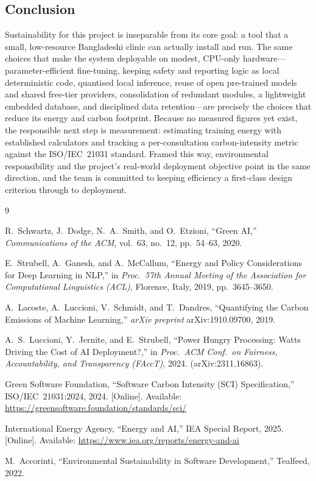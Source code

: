 \documentclass[11pt,a4paper]{article}
\begin{document}
\subsection{Conclusion}
Sustainability for this project is inseparable from its core goal: a tool that a small,
low-resource Bangladeshi clinic can actually install and run. The same choices that make
the system deployable on modest, CPU-only hardware---parameter-efficient fine-tuning,
keeping safety and reporting logic as local deterministic code, quantised local
inference, reuse of open pre-trained models and shared free-tier providers, consolidation
of redundant modules, a lightweight embedded database, and disciplined data
retention---are precisely the choices that reduce its energy and carbon footprint.
Because no measured figures yet exist, the responsible next step is measurement:
estimating training energy with established calculators and tracking a per-consultation
carbon-intensity metric against the ISO/IEC~21031 standard. Framed this way, environmental
responsibility and the project's real-world deployment objective point in the same
direction, and the team is committed to keeping efficiency a first-class design criterion
through to deployment.

\begin{thebibliography}{9}
\footnotesize

R.~Schwartz, J.~Dodge, N.~A.~Smith, and O.~Etzioni,
``Green AI,'' \emph{Communications of the ACM}, vol.~63, no.~12, pp.~54--63, 2020.

E.~Strubell, A.~Ganesh, and A.~McCallum,
``Energy and Policy Considerations for Deep Learning in NLP,''
in \emph{Proc.\ 57th Annual Meeting of the Association for Computational Linguistics (ACL)},
Florence, Italy, 2019, pp.~3645--3650.

A.~Lacoste, A.~Luccioni, V.~Schmidt, and T.~Dandres,
``Quantifying the Carbon Emissions of Machine Learning,''
\emph{arXiv preprint} arXiv:1910.09700, 2019.

A.~S.~Luccioni, Y.~Jernite, and E.~Strubell,
``Power Hungry Processing: Watts Driving the Cost of AI Deployment?,''
in \emph{Proc.\ ACM Conf.\ on Fairness, Accountability, and Transparency (FAccT)}, 2024.
(arXiv:2311.16863).

Green Software Foundation,
``Software Carbon Intensity (SCI) Specification,'' ISO/IEC~21031:2024, 2024.
[Online]. Available: \url{https://greensoftware.foundation/standards/sci/}

International Energy Agency,
``Energy and AI,'' IEA Special Report, 2025.
[Online]. Available: \url{https://www.iea.org/reports/energy-and-ai}

M.~Accorinti,
``Environmental Sustainability in Software Development,'' Tealfeed, 2022.

\end{thebibliography}
\end{document}
